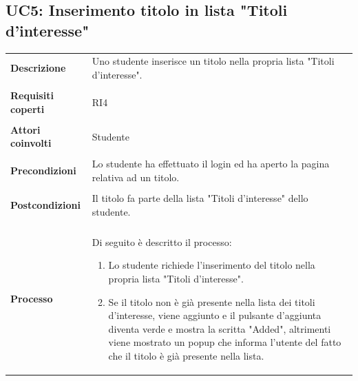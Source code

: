\documentclass[10pt,a4paper]{article}
\begin{document}
	\subsection{UC5: Inserimento titolo in lista "Titoli d'interesse"}
	\begin{tabular}{lp{}}
		\textbf{Descrizione}&Uno studente inserisce un titolo nella propria lista "Titoli d'interesse".\\
		\\
		\textbf{Requisiti coperti}&RI4\\
		\\
		\textbf{Attori coinvolti}&Studente\\
		\\
		\textbf{Precondizioni}&Lo studente ha effettuato il login ed ha aperto la pagina relativa ad un titolo.\\
		\\
		\textbf{Postcondizioni}&Il titolo fa parte della lista "Titoli d'interesse" dello studente.\\
		\\
		\textbf{Processo}&Di seguito è descritto il processo:
		\begin{enumerate}
			\item Lo studente richiede l'inserimento del titolo nella propria lista "Titoli d'interesse".
			\item Se il titolo non è già presente nella lista dei titoli d'interesse, viene aggiunto e il pulsante d'aggiunta diventa verde e mostra la scritta "Added", altrimenti viene mostrato un popup che informa l'utente del fatto che il titolo è già presente nella lista.
		\end{enumerate}
	\end{tabular}
\end{document}
